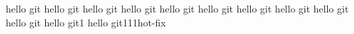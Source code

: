 hello git
hello git
hello git
hello git
hello git
hello git
hello git
hello git
hello git
hello git
hello git1
hello git111hot-fix
